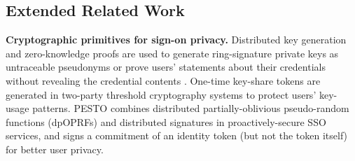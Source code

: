 \begin{comment}
Although \usso\ employs the same mathematical algorithms in its identity transformations as the OPRF protocol \cite{oprf-proved,voprf-proved}, we prove more properties of these algorithms to ensure security and privacy. %
\usso\ depends on the \emph{obliviousness} property to ensure IdP untraceability, %
the \emph{deterministicness} property of \emph{pseudo-random} functions to enable the RP to derive a permanent account for any $t$, and the \emph{randomness} property to provide RP unlinkability. %
Last but not least, \usso\ requires an additional property for SSO services, called \emph{RP designation}.
It is satisfied \emph{only if} no collision exists in RPs' pseudo-identities (see Lemma 1), which are actually the blinded inputs of the evaluated pseudo-random function \cite{oprf-proved,voprf-proved}.
This property %
is not explicitly required in other OPRF-based solutions and therefore may not be supported by all OPRF protocols. Thus, an OPRF protocol is not always ready to implement identity transformations in \usso, unless no collision exists in the blinded inputs.



\end{comment}

\oldc
\subsection{Extended Related Work}
\noindent\textbf{Cryptographic primitives for sign-on privacy.}
Distributed key generation and zero-knowledge proofs are used to generate ring-signature private keys as untraceable pseudonyms \cite{crypto-book} or prove users' statements about their credentials without revealing the credential contents \cite{zklaim}.
One-time key-share tokens \cite{tandem} are generated in two-party threshold cryptography systems to protect users' key-usage patterns.
\newc
PESTO \cite{pesto} combines distributed partially-oblivious pseudo-random functions (dpOPRFs) and distributed signatures in proactively-secure SSO services, and signs a commitment of an identity token (but not the token itself) for better user privacy.

